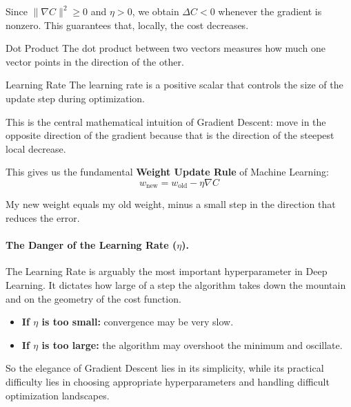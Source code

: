 \documentclass[11pt]{article}
\theoremstyle{smallexample}
\begin{document}
Since \( \|\nabla C\|^2 \geq 0 \) and \( \eta > 0 \), we obtain \( \Delta C < 0 \) whenever the gradient is nonzero. This guarantees that, locally, the cost decreases.

 \begin{defbox}{Dot Product}
 The dot product between two vectors measures how much one vector points in the direction of the other.
 \end{defbox}

 \begin{defbox}{Learning Rate}
 The learning rate is a positive scalar that controls the size of the update step during optimization.
 \end{defbox}

This is the central mathematical intuition of Gradient Descent: move in the opposite direction of the gradient because that is the direction of the steepest local decrease. 



This gives us the fundamental \textbf{Weight Update Rule} of Machine Learning:
\begin{equation}
    w_{\text{new}} = w_{\text{old}} - \eta \nabla C
\end{equation}

My new weight equals my old weight, minus a small step in the direction that reduces the error.
\vspace{-0.2cm}

\paragraph*{The Danger of the Learning Rate ($\eta$).}
The Learning Rate is arguably the most important hyperparameter in Deep Learning. It dictates how large of a step the algorithm takes down the mountain and on the geometry of the cost function.

\begin{itemize}
    \item \textbf{If $\eta$ is too small:}  convergence may be very slow.
    \item \textbf{If $\eta$ is too large:}  the algorithm may overshoot the minimum and oscillate.
\end{itemize}



So the elegance of Gradient Descent lies in its simplicity, while its practical difficulty lies in choosing appropriate hyperparameters and handling difficult optimization landscapes. 
\end{document}
